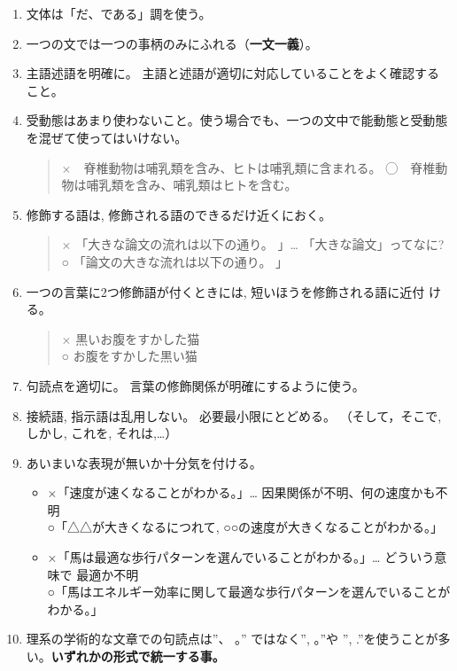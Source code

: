 \documentclass[12pt, ]{jsarticle}
\begin{document}
\begin{enumerate}
\item
  文体は「だ、である」調を使う。
\item
  一つの文では一つの事柄のみにふれる（\textbf{一文一義}）。
\item
  主語述語を明確に。
  主語と述語が適切に対応していることをよく確認すること。
\item
  受動態はあまり使わないこと。使う場合でも、一つの文中で能動態と受動態を混ぜて使ってはいけない。

  \begin{quote}
  ×　脊椎動物は哺乳類を含み、ヒトは哺乳類に含まれる。
  ◯　脊椎動物は哺乳類を含み、哺乳類はヒトを含む。
  \end{quote}
\item
  修飾する語は, 修飾される語のできるだけ近くにおく。

  \begin{quote}
  × 「大きな論文の流れは以下の通り。 」\ldots{}
  「大きな論文」ってなに?\\
  ○ 「論文の大きな流れは以下の通り。 」
  \end{quote}
\item
  一つの言葉に2つ修飾語が付くときには, 短いほうを修飾される語に近付
  ける。

  \begin{quote}
  × 黒いお腹をすかした猫\\
  ○ お腹をすかした黒い猫
  \end{quote}
\item
  句読点を適切に。 言葉の修飾関係が明確にするように使う。
\item
  接続語, 指示語は乱用しない。 必要最小限にとどめる。 （そして，そこで,
  しかし, これを, それは,\ldots{}）
\item
  あいまいな表現が無いか十分気を付ける。

  \begin{itemize}
  \item
    ×「速度が速くなることがわかる。」\ldots{}
    因果関係が不明、何の速度かも不明\\
    ○「△△が大きくなるにつれて, ○○の速度が大きくなることがわかる。」
  \item
    ×「馬は最適な歩行パターンを選んでいることがわかる。」\ldots{}
    どういう意味で 最適か不明\\
    ○「馬はエネルギー効率に関して最適な歩行パターンを選んでいることがわかる。」
  \end{itemize}
\item
  理系の学術的な文章での句読点は''、 。'' ではなく'', 。''や '',
  .''を使うことが多い。\textbf{いずれかの形式で統一する事。}
\end{enumerate}
\end{document}
